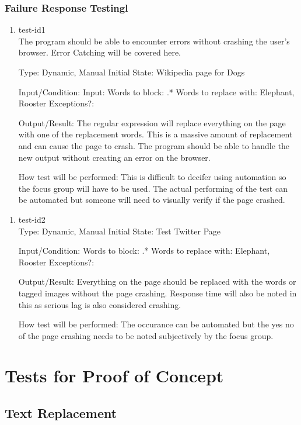 \documentclass[12pt, titlepage]{article}
\begin{document}
\subsubsection{Failure Response Testingl}
\begin{enumerate}
\item{test-id1\\}
The program should be able to encounter errors without crashing the user's browser. Error Catching will be covered here.

Type: Dynamic, Manual
Initial State: Wikipedia page for Dogs
					
Input/Condition: Input: Words to block: .*
Words to replace with: Elephant, Rooster
Exceptions?: 
					
Output/Result: The regular expression will replace everything on the page with one of the replacement words. This is a massive amount of replacement and can cause the page to crash. The program should be able to handle the new output without creating an error on the browser.
					
How test will be performed: This is difficult to decifer using automation so the focus group will have to be used. The actual performing of the test can be automated but someone will need to visually verify if the page crashed.
\end{enumerate}
\begin{enumerate}
\item{test-id2\\}
Type: Dynamic, Manual
Initial State: Test Twitter Page
					
Input/Condition: Words to block: .*
Words to replace with: Elephant, Rooster
Exceptions?: 
					
Output/Result: Everything on the page should be replaced with the words or tagged images without the page crashing. Response time will also be noted in this as serious lag is also considered crashing.
					
How test will be performed: The occurance can be automated but the yes no of the page crashing needs to be noted subjectively by the focus group.
\end{enumerate}
\section{Tests for Proof of Concept}
\subsection{Text Replacement}
		
\end{document}
